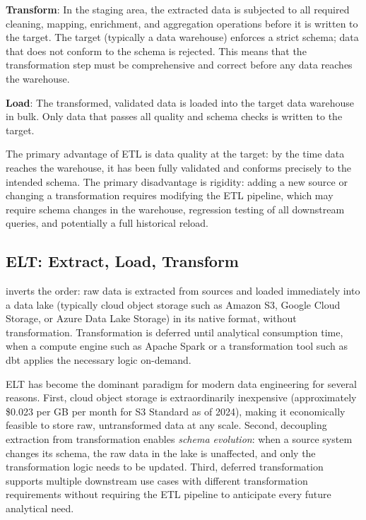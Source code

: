 \textbf{Transform}: In the staging area, the extracted data is
subjected to all required cleaning, mapping, enrichment, and
aggregation operations before it is written to the target. The target
(typically a data warehouse) enforces a strict schema; data that does
not conform to the schema is rejected. This means that the transformation
step must be comprehensive and correct before any data reaches the
warehouse.

\textbf{Load}: The transformed, validated data is loaded into the
target data warehouse in bulk. Only data that passes all quality and
schema checks is written to the target.

The primary advantage of ETL is data quality at the target: by the time
data reaches the warehouse, it has been fully validated and conforms
precisely to the intended schema. The primary disadvantage is
rigidity: adding a new source or changing a transformation requires
modifying the ETL pipeline, which may require schema changes in the
warehouse, regression testing of all downstream queries, and potentially
a full historical reload.

\subsection{ELT: Extract, Load, Transform}
\label{subsec:elt}

 inverts the order: raw data is extracted from sources and
loaded immediately into a data lake (typically cloud object storage such
as Amazon S3, Google Cloud Storage, or Azure Data Lake Storage) in its
native format, without transformation. Transformation is deferred until
analytical consumption time, when a compute engine such as Apache Spark
or a transformation tool such as dbt applies the necessary logic
on-demand.

ELT has become the dominant paradigm for modern data engineering for
several reasons. First, cloud object storage is extraordinarily
inexpensive (approximately \$0.023 per GB per month for S3 Standard as
of 2024), making it economically feasible to store raw, untransformed
data at any scale. Second, decoupling extraction from transformation
enables \emph{schema evolution}: when a source system changes its schema,
the raw data in the lake is unaffected, and only the transformation
logic needs to be updated. Third, deferred transformation supports
multiple downstream use cases with different transformation requirements
without requiring the ETL pipeline to anticipate every future analytical
need.

